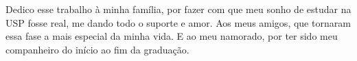 Dedico esse trabalho à minha família, por fazer com que meu sonho de estudar na USP fosse real, me dando todo o suporte e amor. Aos meus amigos, que tornaram essa fase a mais especial da minha vida. E ao meu namorado, por ter sido meu companheiro do início ao fim da graduação.